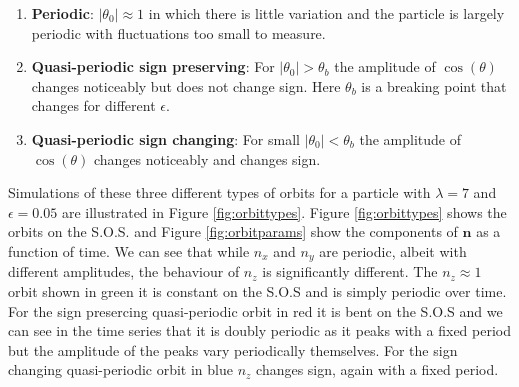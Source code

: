 \begin{enumerate}
\item \textbf{Periodic}: $\left|\theta_0\right| \approx 1$ in which there is little variation and the particle is largely periodic with fluctuations too small to measure.
\item \textbf{Quasi-periodic sign preserving}: For $\left|\theta_0\right|> \theta_b$ the amplitude of $\cos(\theta)$ changes noticeably but does not change sign. Here $\theta_b$ is a breaking point that changes for different $\epsilon$.
\item \textbf{Quasi-periodic sign changing}: For small $\left|\theta_0\right| < \theta_b$ the amplitude of $\cos(\theta)$ changes noticeably and changes sign. 
\end{enumerate}

Simulations of these three different types of orbits for a particle with $\lambda=7$ and $\epsilon=0.05$ are illustrated in Figure \ref{fig:orbittypes}. Figure \ref{fig:orbittypes} shows the orbits on the S.O.S. and Figure \ref{fig:orbitparams} show the components of $\mathbf{n}$ as a function of time. We can see that while $n_x$ and $n_y$ are periodic, albeit with different amplitudes, the  behaviour of $n_z$ is significantly different. The $n_z \approx 1$  orbit shown in green it is constant on the S.O.S and is simply periodic over time. For the sign presercing quasi-periodic orbit in red it is bent on the S.O.S and we can see in the time series that it is doubly periodic as it peaks with a fixed period but the amplitude of the peaks vary periodically themselves. For the sign changing quasi-periodic orbit in blue $n_z$ changes sign, again with a fixed period.


